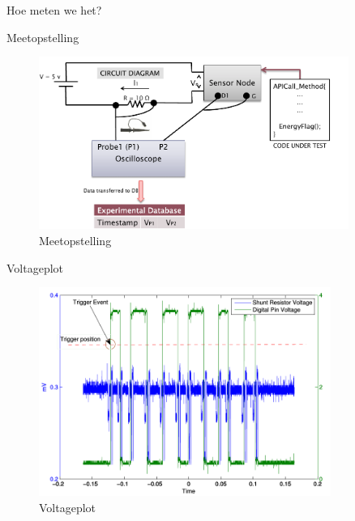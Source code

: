 \documentclass[presentation, bigger]{beamer}
\begin{document}
\begin{frame}[label=sec-3-2]{Hoe meten we het?}
\begin{minipage}{\textwidth}
\centering
{} 
\end{minipage}
\end{frame}

\begin{frame}[label=sec-3-3]{Meetopstelling}
  \begin{figure}[center]
    \centering
    \includegraphics[width=0.9\textwidth,keepaspectration=true]{elek/diag1}
    \caption{Meetopstelling}
  \end{figure}
\end{frame}

\begin{frame}[label=sec-3-4]{Voltageplot}
  \begin{figure}
    \centering
    \includegraphics[width=0.85\textwidth,keepaspectration=true]{elek/energy_measurement_plot.png}
    \caption{Voltageplot}
  \end{figure}
\end{frame}
\end{document}
